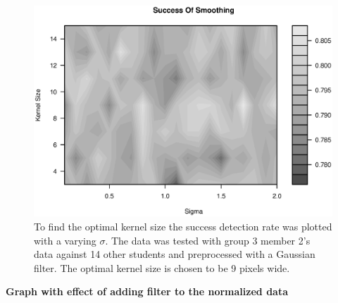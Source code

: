 \begin{figure}
\centering
\includegraphics[width = \textwidth]{graphics/success_of_smoothing_contour}
\caption{To find the optimal kernel size the success detection rate was plotted with a varying $\sigma$.
The data was tested with group 3 member 2's data against 14 other students and preprocessed with a Gaussian filter. 
The optimal kernel size is chosen to be 9 pixels wide.
}
\end{figure}



\textbf{Graph with effect of adding filter to the normalized data}


